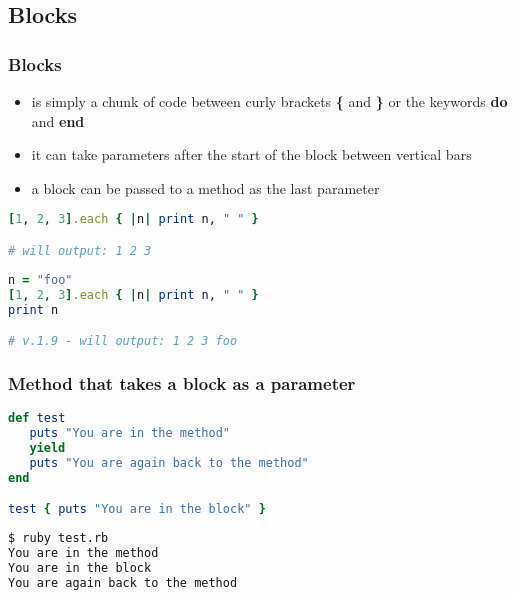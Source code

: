 \subsection{Blocks}
\begin{frame}[fragile]\frametitle{Blocks}

\begin{itemize}

\item is simply a chunk of code between curly brackets \textbf{\{} and \textbf{\}} or the keywords \textbf{do} and \textbf{end}

\item it can take parameters after the start of the block between vertical bars
 
\item a block can be passed to a method as the last parameter 
\end{itemize}

\pause

\begin{lstlisting}[language=ruby]
[1, 2, 3].each { |n| print n, " " }

# will output: 1 2 3
\end{lstlisting}

\pause

\begin{lstlisting}[language=ruby]
n = "foo"
[1, 2, 3].each { |n| print n, " " }
print n

# v.1.9 - will output: 1 2 3 foo
\end{lstlisting}

\end{frame}


\begin{frame}[fragile]\frametitle{Method that takes a block as a parameter}

\begin{lstlisting}[language=ruby]
def test
   puts "You are in the method"
   yield
   puts "You are again back to the method"
end

test { puts "You are in the block" }
\end{lstlisting}
\pause

\begin{lstlisting}[language=bash]
$ ruby test.rb 
You are in the method
You are in the block
You are again back to the method
\end{lstlisting}

\end{frame}


